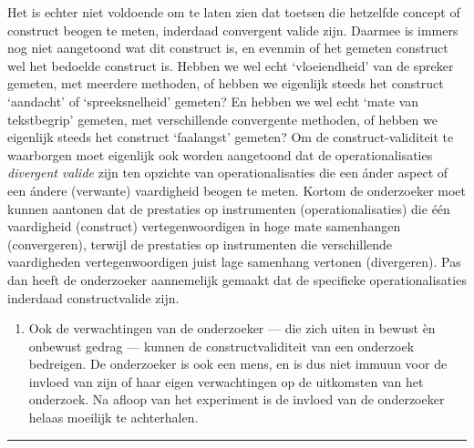 \documentclass[
]{book}
\providecommand{\tightlist}{%
  \setlength{\itemsep}{0pt}\setlength{\parskip}{0pt}}
\begin{document}
Het is echter niet voldoende om te laten zien dat toetsen die hetzelfde
concept of construct beogen te meten, inderdaad convergent valide zijn.
Daarmee is immers nog niet aangetoond wat dit construct is, en evenmin
of het gemeten construct wel het bedoelde construct is. Hebben we wel
echt `vloeiendheid' van de spreker gemeten, met meerdere methoden, of
hebben we eigenlijk steeds het construct `aandacht' of `spreeksnelheid'
gemeten? En hebben we wel echt `mate van tekstbegrip' gemeten, met
verschillende convergente methoden, of hebben we eigenlijk steeds het
construct `faalangst' gemeten? Om de construct-validiteit te waarborgen
moet eigenlijk ook worden aangetoond dat de operationalisaties
\emph{divergent valide} zijn ten opzichte van operationalisaties die een
ánder aspect of een ándere (verwante) vaardigheid beogen te meten.
Kortom de onderzoeker moet kunnen aantonen dat de prestaties op
instrumenten (operationalisaties) die één vaardigheid (construct)
vertegenwoordigen in hoge mate samenhangen (convergeren), terwijl de
prestaties op instrumenten die verschillende vaardigheden
vertegenwoordigen juist lage samenhang vertonen (divergeren). Pas dan
heeft de onderzoeker aannemelijk gemaakt dat de specifieke
operationalisaties inderdaad constructvalide zijn.

\begin{enumerate}
\def\labelenumi{\arabic{enumi}.}
\setcounter{enumi}{1}
\tightlist
\item
  Ook de verwachtingen van de onderzoeker --- die zich uiten in bewust
  èn onbewust gedrag --- kunnen de constructvaliditeit van een onderzoek
  bedreigen. De onderzoeker is ook een mens, en is dus niet immuun voor de
  invloed van zijn of haar eigen verwachtingen op de uitkomsten van het
  onderzoek. Na afloop van het experiment is de invloed van de onderzoeker
  helaas moeilijk te achterhalen.
\end{enumerate}

\begin{center}\rule{0.5\linewidth}{0.5pt}\end{center}
\end{document}
